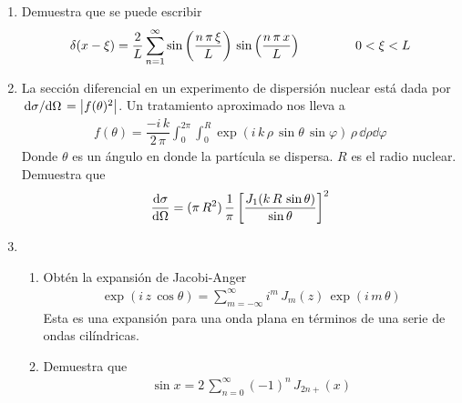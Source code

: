 \begin{enumerate}
\begin{enumerate}
\end{enumerate}
\item Demuestra que se puede escribir
\[ \delta (x - \xi) = \dfrac{2}{L} \sum_{n=1}^{\infty} \sin \left( \dfrac{n \, \pi \, \xi}{L} \right) \, \sin \left( \dfrac{n \, \pi \, x}{L} \right) \hspace{1.5cm} 0 < \xi < L  \]
\item La sección diferencial en un experimento de dispersión nuclear está dada por $\dv*{\sigma}{\Omega} = \abs{f(\theta)^{2}}$. Un tratamiento aproximado nos lleva a
\begin{align*}
f(\theta) = \dfrac{- i \, k}{2 \, \pi} \int_{0}^{2 \pi} \int_{0}^{R} \exp(i \, k \, \rho \, \sin \theta \, \sin \varphi ) \,  \rho \, \dd{\rho} \dd{\varphi}
\end{align*}
Donde $\theta$ es un ángulo en donde la partícula se dispersa. $R$ es el radio nuclear. Demuestra que
\begin{align*}
\dv{\sigma}{\Omega} = (\pi \, R^{2}) \, \dfrac{1}{\pi} \left[ \dfrac{J_{1} (k \, R \, \sin \theta)}{\sin \theta} \right]^{2}
\end{align*}
\item \begin{enumerate}
\item Obtén la expansión de Jacobi-Anger
\begin{align*}
\exp(i \, z \, \cos \theta) = \sum_{m=-\infty}^{\infty} i^{m} \, J_{m}(z) \, \exp(i \, m \, \theta)
\end{align*}
Esta es una expansión para una onda plana en términos de una serie de ondas cilíndricas.
\item Demuestra que
\begin{align*}
\sin x = 2 \, \sum_{n=0}^{\infty} (-1)^{n} \, J_{2n+} (x)
\end{align*}
\end{enumerate}
\end{enumerate}
